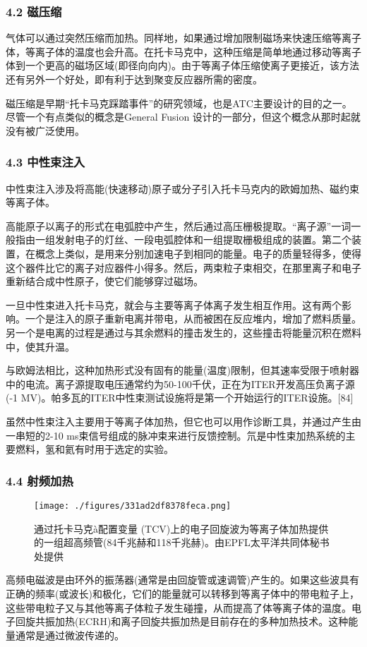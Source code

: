 \subsubsection{4.2 磁压缩}
气体可以通过突然压缩而加热。同样地，如果通过增加限制磁场来快速压缩等离子体，等离子体的温度也会升高。在托卡马克中，这种压缩是简单地通过移动等离子体到一个更高的磁场区域(即径向向内)。由于等离子体压缩使离子更接近，该方法还有另外一个好处，即有利于达到聚变反应器所需的密度。

磁压缩是早期“托卡马克踩踏事件”的研究领域，也是ATC主要设计的目的之一。尽管一个有点类似的概念是General Fusion 设计的一部分，但这个概念从那时起就没有被广泛使用。
\subsubsection{4.3 中性束注入}
中性束注入涉及将高能(快速移动)原子或分子引入托卡马克内的欧姆加热、磁约束等离子体。

高能原子以离子的形式在电弧腔中产生，然后通过高压栅极提取。“离子源”一词一般指由一组发射电子的灯丝、一段电弧腔体和一组提取栅极组成的装置。第二个装置，在概念上类似，是用来分别加速电子到相同的能量。电子的质量轻得多，使得这个器件比它的离子对应器件小得多。然后，两束粒子束相交，在那里离子和电子重新结合成中性原子，使它们能够穿过磁场。

一旦中性束进入托卡马克，就会与主要等离子体离子发生相互作用。这有两个影响。一个是注入的原子重新电离并带电，从而被困在反应堆内，增加了燃料质量。另一个是电离的过程是通过与其余燃料的撞击发生的，这些撞击将能量沉积在燃料中，使其升温。

与欧姆法相比，这种加热形式没有固有的能量(温度)限制，但其速率受限于喷射器中的电流。离子源提取电压通常约为50-100千伏，正在为ITER开发高压负离子源(-1 MV)。帕多瓦的ITER中性束测试设施将是第一个开始运行的ITER设施。[84]

虽然中性束注入主要用于等离子体加热，但它也可以用作诊断工具，并通过产生由一串短的2-10 ms束信号组成的脉冲束来进行反馈控制。氘是中性束加热系统的主要燃料，氢和氦有时用于选定的实验。
\subsubsection{4.4 射频加热}
\begin{figure}[ht]
\centering
\texttt{[image: ./figures/331ad2df8378feca.png]}
\caption{通过托卡马克à配置变量 (TCV)上的电子回旋波为等离子体加热提供的一组超高频管(84千兆赫和118千兆赫)。由EPFL太平洋共同体秘书处提供} \label{fig_TKMK_6}
\end{figure}
高频电磁波是由环外的振荡器(通常是由回旋管或速调管)产生的。如果这些波具有正确的频率(或波长)和极化，它们的能量就可以转移到等离子体中的带电粒子上，这些带电粒子又与其他等离子体粒子发生碰撞，从而提高了体等离子体的温度。电子回旋共振加热(ECRH)和离子回旋共振加热是目前存在的多种加热技术。这种能量通常是通过微波传递的。